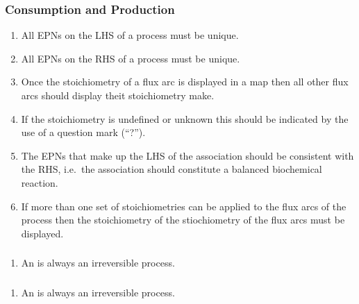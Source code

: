 \subsubsection{Consumption and Production}

\begin{enumerate}
    \item All EPNs on the LHS of a process must be unique.
    \item All EPNs on the RHS of a process must be unique.
    \item Once the stoichiometry of a flux arc is displayed in a map then all other flux arcs should
    display theit stoichiometry make.
    \item If the stoichiometry is undefined or unknown this should be indicated by the use of a question mark (``?''). 
    \item The EPNs that make up the LHS of the association should be consistent with the RHS, i.e.\, the association should constitute a balanced biochemical reaction.
    \item If more than one set of stoichiometries can be applied to the flux arcs of the process then the stoichiometry of the stiochiometry of the flux arcs must be displayed.
\end{enumerate}  

\subsubsection{}

  \begin{enumerate}
    \item An  is always an irreversible process.
\end{enumerate}  

\subsubsection{}
  \begin{enumerate}
    \item An  is always an irreversible process.
\end{enumerate}  


